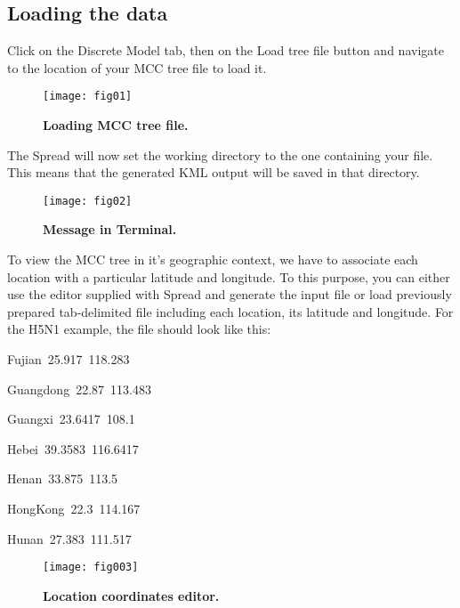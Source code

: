 \subsection{Loading the data}

Click on the Discrete Model tab, then on the Load tree file button
and navigate to the location of your MCC tree file to load it.

\begin{figure}[H]
\begin{centering}
\texttt{[image: fig01]}
\caption{
{ \footnotesize 
{\bf Loading MCC tree file.}
} %
}
\label{fig:01}
\par\end{centering}
\end{figure}


The Spread will now set the working directory to the one containing
your file. This means that the generated KML output will be saved
in that directory.

\begin{figure}[H]
\begin{centering}
\texttt{[image: fig02]}
\caption{
{ \footnotesize 
{\bf Message in Terminal.}
} %
}
\label{fig:02}
\par\end{centering}
\end{figure}

To view the MCC tree in it's geographic context, we have to associate
each location with a particular latitude and longitude. To this purpose,
you can either use the editor supplied with Spread and generate the
input file or load previously prepared tab-delimited file including
each location, its latitude and longitude. For the H5N1 example, the
file should look like this:

\begin{lyxcode}
Fujian~25.917~118.283

Guangdong~22.87~113.483

Guangxi~23.6417~108.1

Hebei~39.3583~116.6417

Henan~33.875~113.5

HongKong~22.3~114.167

Hunan~27.383~111.517
\end{lyxcode}

\begin{figure}[H]
\begin{centering}
\texttt{[image: fig003]}
\caption{
{ \footnotesize 
{\bf Location coordinates editor.}
} %
}
\label{fig:003}
\par\end{centering}
\end{figure}

